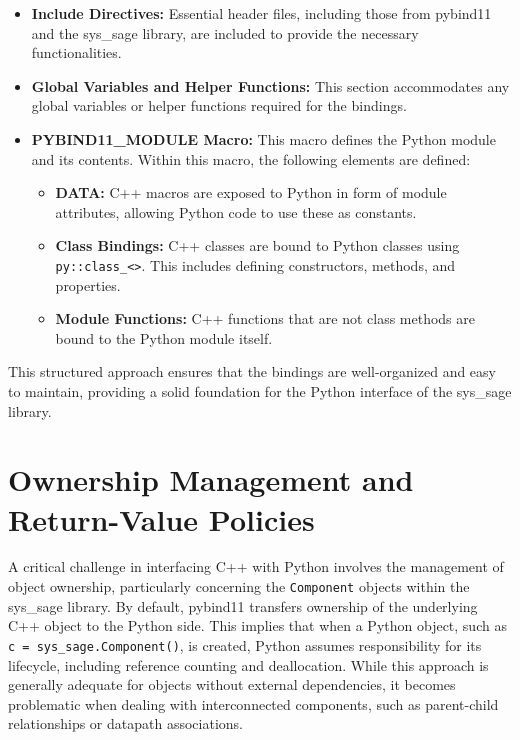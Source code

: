 \begin{itemize}
    \item   \textbf{Include Directives:} Essential header files, including those from pybind11 and the sys\_sage library, are included to provide the necessary functionalities.
    \item   \textbf{Global Variables and Helper Functions:} This section accommodates any global variables or helper functions required for the bindings.
    \item   \textbf{PYBIND11\_MODULE Macro:} This macro defines the Python module and its contents. Within this macro, the following elements are defined:
        \begin{itemize}
            \item   \textbf{DATA:} C++ macros are exposed to Python in form of module attributes, allowing Python code to use these as constants.
            \item   \textbf{Class Bindings:} C++ classes are bound to Python classes using \verb|py::class_<>|. This includes defining constructors, methods, and properties.
            \item   \textbf{Module Functions:} C++ functions that are not class methods are bound to the Python module itself.
        \end{itemize}
\end{itemize}

This structured approach ensures that the bindings are well-organized and easy to maintain, providing a solid foundation for the Python interface of the sys\_sage library.

\section{Ownership Management and Return-Value Policies}

A critical challenge in interfacing C++ with Python involves the management of object ownership, particularly concerning the \verb|Component| objects within the sys\_sage library. By default, pybind11 transfers ownership of the underlying C++ object to the Python side. This implies that when a Python object, such as \verb|c = sys_sage.Component()|, is created, Python assumes responsibility for its lifecycle, including reference counting and deallocation. While this approach is generally adequate for objects without external dependencies, it becomes problematic when dealing with interconnected components, such as parent-child relationships or datapath associations.


